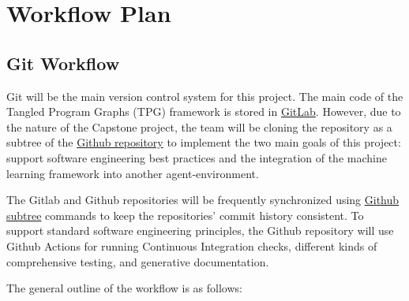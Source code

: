 \documentclass{article}
\begin{document}
\section{Workflow Plan}

\subsection{Git Workflow}
Git will be the main version control system for this project. The main code of the Tangled Program Graphs (TPG) framework is stored in \href{https://gitlab.cas.mcmaster.ca/kellys32/tpg}{GitLab}. However, due to the nature of the Capstone project, the team will be cloning the repository as a subtree of the \href{https://github.com/TPGEngine/tpg}{Github repository} to implement the two main goals of this project: support software engineering best practices and the integration of the machine learning framework into another agent-environment. 

\vspace*{10pt}

\noindent The Gitlab and Github repositories will be frequently synchronized using \href{https://gist.github.com/SKempin/b7857a6ff6bddb05717cc17a44091202}{Github subtree} commands to keep the repositories’ commit history consistent. To support standard software engineering principles, the Github repository will use Github Actions for running Continuous Integration checks, different kinds of comprehensive testing, and generative documentation.

\vspace{10pt}

\noindent The general outline of the workflow is as follows:
\end{document}
